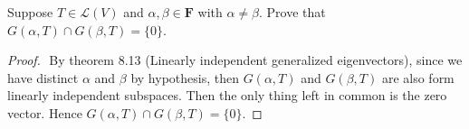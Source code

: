 Suppose $T \in \mathcal{L}(V)$ and $\alpha , \beta \in \mathbf{F}$ with $\alpha \ne \beta$.  Prove that $G(\alpha, T) \cap G(\beta,T) = \{ 0 \}$.

\begin{proof} $ $
    By theorem 8.13 (Linearly independent generalized eigenvectors), since we have distinct $\alpha$ and $\beta$ by hypothesis, then $G(\alpha, T)$ and $G(\beta, T)$ are also form linearly independent subspaces. Then the only thing left in common is the zero vector. Hence $G(\alpha, T) \cap G(\beta,T) = \{ 0 \}$.  
\end{proof}